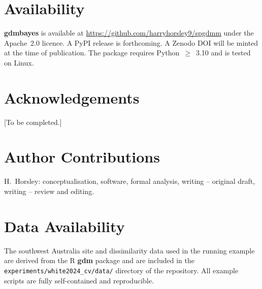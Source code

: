 \documentclass[12pt,a4paper]{article}
\begin{document}
\section{Availability}\label{sec:availability}

\textbf{gdmbayes} is available at \url{https://github.com/harryhorsley9/spgdmm}
under the Apache~2.0 licence. A PyPI release is forthcoming. A Zenodo DOI will
be minted at the time of publication. The package requires Python~$\geq$~3.10
and is tested on Linux.

\section*{Acknowledgements}

[To be completed.]

\section*{Author Contributions}

H.~Horsley: conceptualisation, software, formal analysis, writing --
original draft, writing -- review and editing.

\section*{Data Availability}

The southwest Australia site and dissimilarity data used in the running example
are derived from the R \textbf{gdm} package \citep{fitzpatrick2021} and are
included in the \texttt{experiments/white2024\_cv/data/} directory of the
repository. All example scripts are fully self-contained and reproducible.



\end{document}
